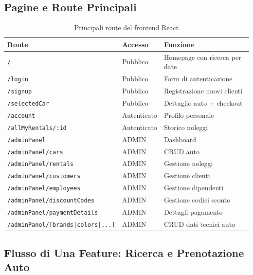 \documentclass[12pt, a4paper]{article}
\begin{document}
    \subsection{Pagine e Route Principali}

    \begin{table}[H]
        \centering
        \small
        \begin{tabular}{|l|l|l|}
            \hline
            \textbf{Route} & \textbf{Accesso} & \textbf{Funzione} \\
            \hline
            \texttt{/} & Pubblico & Homepage con ricerca per date \\
            \texttt{/login} & Pubblico & Form di autenticazione \\
            \texttt{/signup} & Pubblico & Registrazione nuovi clienti \\
            \texttt{/selectedCar} & Pubblico & Dettaglio auto + checkout \\
            \texttt{/account} & Autenticato & Profilo personale \\
            \texttt{/allMyRentals/:id} & Autenticato & Storico noleggi \\
            \texttt{/adminPanel} & ADMIN & Dashboard \\
            \texttt{/adminPanel/cars} & ADMIN & CRUD auto \\
            \texttt{/adminPanel/rentals} & ADMIN & Gestione noleggi \\
            \texttt{/adminPanel/customers} & ADMIN & Gestione clienti \\
            \texttt{/adminPanel/employees} & ADMIN & Gestione dipendenti \\
            \texttt{/adminPanel/discountCodes} & ADMIN & Gestione codici sconto \\
            \texttt{/adminPanel/paymentDetails} & ADMIN & Dettagli pagamento \\
            \texttt{/adminPanel/[brands|colors|...]} & ADMIN & CRUD dati tecnici auto \\
            \hline
        \end{tabular}
        \caption{Principali route del frontend React}
        \label{tab:frontend_routes}
    \end{table}

    \subsection{Flusso di Una Feature: Ricerca e Prenotazione Auto}
\end{document}
